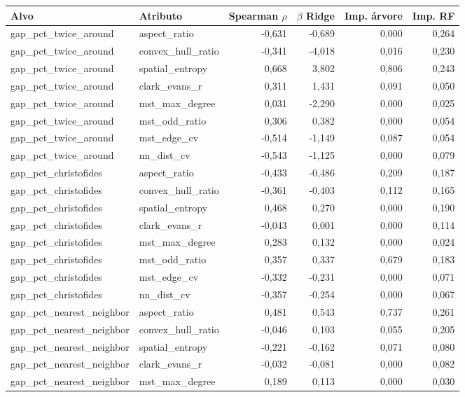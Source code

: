 \begin{tabular}{llrrrr}
\toprule
Alvo & Atributo & Spearman $\rho$ & $\beta$ Ridge & Imp. árvore & Imp. RF \\
\midrule
gap\_pct\_twice\_around & aspect\_ratio & -0,631 & -0,689 & 0,000 & 0,264 \\
gap\_pct\_twice\_around & convex\_hull\_ratio & -0,341 & -4,018 & 0,016 & 0,230 \\
gap\_pct\_twice\_around & spatial\_entropy & 0,668 & 3,802 & 0,806 & 0,243 \\
gap\_pct\_twice\_around & clark\_evans\_r & 0,311 & 1,431 & 0,091 & 0,050 \\
gap\_pct\_twice\_around & mst\_max\_degree & 0,031 & -2,290 & 0,000 & 0,025 \\
gap\_pct\_twice\_around & mst\_odd\_ratio & 0,306 & 0,382 & 0,000 & 0,054 \\
gap\_pct\_twice\_around & mst\_edge\_cv & -0,514 & -1,149 & 0,087 & 0,054 \\
gap\_pct\_twice\_around & nn\_dist\_cv & -0,543 & -1,125 & 0,000 & 0,079 \\
gap\_pct\_christofides & aspect\_ratio & -0,433 & -0,486 & 0,209 & 0,187 \\
gap\_pct\_christofides & convex\_hull\_ratio & -0,361 & -0,403 & 0,112 & 0,165 \\
gap\_pct\_christofides & spatial\_entropy & 0,468 & 0,270 & 0,000 & 0,190 \\
gap\_pct\_christofides & clark\_evans\_r & -0,043 & 0,001 & 0,000 & 0,114 \\
gap\_pct\_christofides & mst\_max\_degree & 0,283 & 0,132 & 0,000 & 0,024 \\
gap\_pct\_christofides & mst\_odd\_ratio & 0,357 & 0,337 & 0,679 & 0,183 \\
gap\_pct\_christofides & mst\_edge\_cv & -0,332 & -0,231 & 0,000 & 0,071 \\
gap\_pct\_christofides & nn\_dist\_cv & -0,357 & -0,254 & 0,000 & 0,067 \\
gap\_pct\_nearest\_neighbor & aspect\_ratio & 0,481 & 0,543 & 0,737 & 0,261 \\
gap\_pct\_nearest\_neighbor & convex\_hull\_ratio & -0,046 & 0,103 & 0,055 & 0,205 \\
gap\_pct\_nearest\_neighbor & spatial\_entropy & -0,221 & -0,162 & 0,071 & 0,080 \\
gap\_pct\_nearest\_neighbor & clark\_evans\_r & -0,032 & -0,081 & 0,000 & 0,082 \\
gap\_pct\_nearest\_neighbor & mst\_max\_degree & 0,189 & 0,113 & 0,000 & 0,030 \\

\end{tabular}
